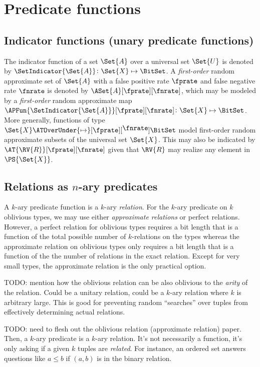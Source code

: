 \documentclass[ ../main.tex]{subfiles}
\begin{document}
\section{Predicate functions}
\label{sec:pred}



\subsection{Indicator functions (unary predicate functions)}
The indicator function of a set $\Set{A}$ over a universal set $\Set{U}$ is denoted by $\SetIndicator{\Set{A}} \colon \Set{X} \mapsto \BitSet$.
A \emph{first-order} random approximate set of $\Set{A}$ with a false positive rate $\fprate$ and false negative rate $\fnrate$ is denoted by $\ASet{A}[\fprate][\fnrate]$, which may be modeled by a \emph{first-order} random approximate map $\APFun{\SetIndicator{\Set{A}}}[\fprate][\fnrate] \colon \Set{X} \mapsto \BitSet$.
More generally, functions of type $\Set{X} \ATOverUnder{\mapsto}[\fprate][\text{\raisebox{3pt}{$\fnrate$}}] \BitSet$ model first-order random approximate subsets of the universal set $\Set{X}$.
This may also be indicated by $\AT{\RV{R}}[\fprate][\fnrate]$ given that $\RV{R}$ may realize any element in $\PS{\Set{X}}$.


\subsection{Relations as $n$-ary predicates}

A $k$-ary predicate function is a $k$-ary \emph{relation}. For the $k$-ary predicate on $k$ oblivious types, we may use either \emph{approximate relations} or perfect relations. However, a perfect relation for oblivious types requires a bit length that is a function of the total possible number of $k$-relations on the types whereas the approximate relation on oblivious types only requires a bit length that is a function of the the number of relations in the exact relation.
Except for very small types, the approximate relation is the only practical option.

TODO: mention how the oblivious relation can be also oblivious to the \emph{arity} of the relation.
Could be a unitary relation, could be a $k$-ary relation where $k$ is arbitrary large. This is good for preventing random ``searches'' over tuples from effectively determining actual relations.

TODO: need to flesh out the oblivious relation (approximate relation) paper.
Then, a $k$-ary predicate is a $k$-ary relation. It's not necessarily a function, it's only asking if a given $k$ tuples are \emph{related}. For instance, an ordered set answers questions like $a \leq b$ if $(a,b)$ is in the binary relation.
\end{document}
